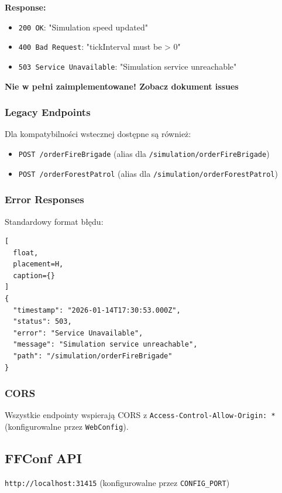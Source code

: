 \documentclass[11pt,a4paper] {article}
\begin{document}
\textbf{Response:}
\begin{itemize}
    \item \texttt{200 OK}: "Simulation speed updated"
    \item \texttt{400 Bad Request}: "tickInterval must be > 0"
    \item \texttt{503 Service Unavailable}: "Simulation service unreachable"
\end{itemize}

\textbf{Nie w pełni zaimplementowane! Zobacz dokument issues}

\subsubsection{Legacy Endpoints}

Dla kompatybilności wstecznej dostępne są również:
\begin{itemize}
    \item \texttt{POST /orderFireBrigade} (alias dla \texttt{/simulation/orderFireBrigade})
    \item \texttt{POST /orderForestPatrol} (alias dla \texttt{/simulation/orderForestPatrol})
\end{itemize}

\subsubsection{Error Responses}

Standardowy format błędu:
\begin{lstlisting}[
  float,
  placement=H,
  caption={}
]
{
  "timestamp": "2026-01-14T17:30:53.000Z",
  "status": 503,
  "error": "Service Unavailable",
  "message": "Simulation service unreachable",
  "path": "/simulation/orderFireBrigade"
}
\end{lstlisting}

\subsubsection{CORS}

Wszystkie endpointy wspierają CORS z \texttt{Access-Control-Allow-Origin: *} (konfigurowalne przez \texttt{WebConfig}).

\subsection{FFConf API}

\texttt{http://localhost:31415} (konfigurowalne przez \texttt{CONFIG\_PORT})
\end{document}
